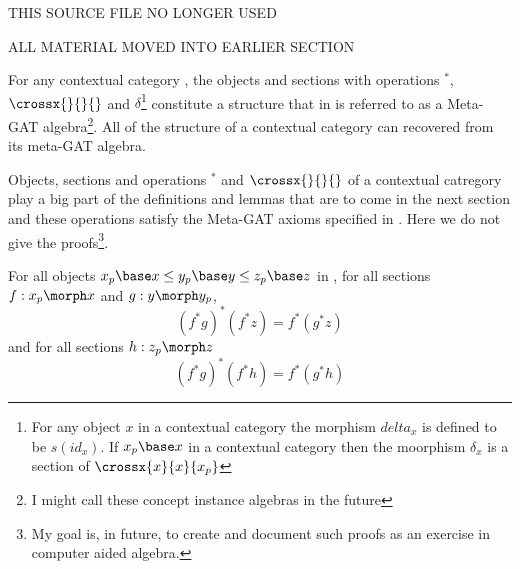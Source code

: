THIS SOURCE FILE NO LONGER USED

ALL MATERIAL MOVED INTO EARLIER SECTION

For any contextual category \catc, the objects and sections with  operations $^*$,  $\crossx{}{}{}$ 
and $\delta$\footnote{For any object $x$ in a contextual category the morphism $delta_x$ is defined to be  $s(id_x)$. If $x_p \base x$ in 
a contextual category \catcw then the moorphism $\delta_x$ is a section of $\crossx{x}{x}{x_p}$} constitute a structure
that in \cite{CartmellMetaTheory} is referred to as a Meta-GAT algebra\footnote{I might call these concept instance algebras in the future}. 
All of the structure of a contextual category  can recovered from its meta-GAT algebra.

Objects, sections and operations $^*$ and  $\crossx{}{}{}$ of a contextual catregory play a big part of the definitions and lemmas that are to come in the next section
and these operations satisfy the Meta-GAT axioms specified in  \cite{CartmellMetaTheory}.
Here we do not give the proofs\footnote{My goal is, in future, to create and document such proofs as an exercise in computer aided algebra.}.

\begin{lemma}
For all objects $x_p \base x \leq y_p \base y \leq z_p \base z$ in \catc, for all sections $f: x_p \morph x$ and $g: y \morph y_p$, 
\begin{equation}
\label{metagattriplestar}
(f^*g)^*(f^*z)=f^*(g^*z)
\end{equation}
and for all sections $h:z_p \morph z$
\begin{equation}
\label{metagattriplestarsection}
(f^*g)^*(f^*h)=f^*(g^*h)
\end{equation}
\end{lemma}



